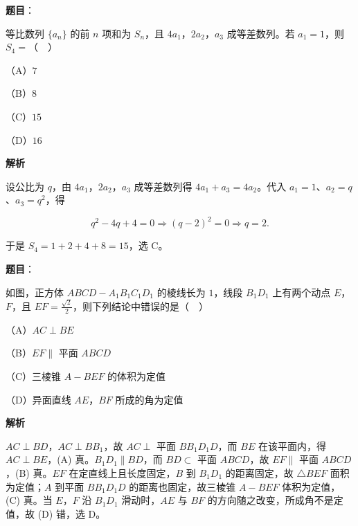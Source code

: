 \begin{answer}

\textbf{题目}：

等比数列 $\{a_n\}$ 的前 $n$ 项和为 $S_n$，且 $4a_1$，$2a_2$，$a_3$ 成等差数列。若 $a_1=1$，则 $S_4=$（　）

（A）$7$

（B）$8$

（C）$15$

（D）$16$

\textbf{解析}

设公比为 $q$，由 $4a_1$，$2a_2$，$a_3$ 成等差数列得 $4a_1+a_3=4a_2$。代入 $a_1=1$、$a_2=q$、$a_3=q^2$，得

\nopagebreak[4]
\[q^2-4q+4=0\Longrightarrow(q-2)^2=0\Longrightarrow q=2 .\]

于是 $S_4=1+2+4+8=15$，选 C。


\end{answer}
\begin{answer}

\textbf{题目}：

如图，正方体 $ABCD-A_1B_1C_1D_1$ 的棱线长为 $1$，线段 $B_1D_1$ 上有两个动点 $E$，$F$，且 $EF=\frac{\sqrt2}{2}$，则下列结论中错误的是（　）
\nopagebreak[4]
\begin{center}\end{center}
\nopagebreak[4]
（A）$AC\perp BE$

（B）$EF\parallel$ 平面 $ABCD$

（C）三棱锥 $A-BEF$ 的体积为定值

（D）异面直线 $AE$，$BF$ 所成的角为定值

\textbf{解析}

$AC\perp BD$，$AC\perp BB_1$，故 $AC\perp$ 平面 $BB_1D_1D$，而 $BE$ 在该平面内，得 $AC\perp BE$，(A) 真。$B_1D_1\parallel BD$，而 $BD\subset$ 平面 $ABCD$，故 $EF\parallel$ 平面 $ABCD$，(B) 真。$EF$ 在定直线上且长度固定，$B$ 到 $B_1D_1$ 的距离固定，故 $\triangle BEF$ 面积为定值；$A$ 到平面 $BB_1D_1D$ 的距离也固定，故三棱锥 $A-BEF$ 体积为定值，(C) 真。当 $E$，$F$ 沿 $B_1D_1$ 滑动时，$AE$ 与 $BF$ 的方向随之改变，所成角不是定值，故 (D) 错，选 D。


\end{answer}
